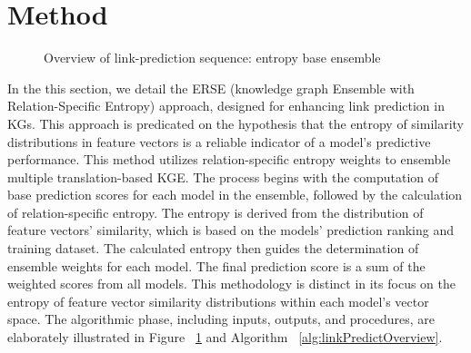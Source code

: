 \documentclass{article}
\begin{document}
\section{Method}
\label{Method}
\bgroup
\begin{figure}[t]
  \centering \makeatletter{}
  \makeatother
  \caption{{Overview of link-prediction sequence: entropy base ensemble}}
  \label{fig:sysArch}
  \hfill
\end{figure}
\egroup

In the this section, we detail the ERSE (knowledge graph Ensemble with Relation-Specific Entropy) approach, designed for enhancing link prediction in KGs. This approach is predicated on the hypothesis that the entropy of similarity distributions in feature vectors is a reliable indicator of a model's predictive performance. This method utilizes relation-specific entropy weights to ensemble multiple translation-based KGE. The process begins with the computation of base prediction scores for each model in the ensemble, followed by the calculation of relation-specific entropy. The entropy is derived from the distribution of feature vectors' similarity, which is based on the models' prediction ranking and training dataset. The calculated entropy then guides the determination of ensemble weights for each model. The final prediction score is a sum of the weighted scores from all models. This methodology is distinct in its focus on the entropy of feature vector similarity distributions within each model's vector space. The algorithmic phase, including inputs, outputs, and procedures, are elaborately illustrated in Figure ~\ref{fig:sysArch} and Algorithm ~\ref{alg:linkPredictOverview}. 
\end{document}
